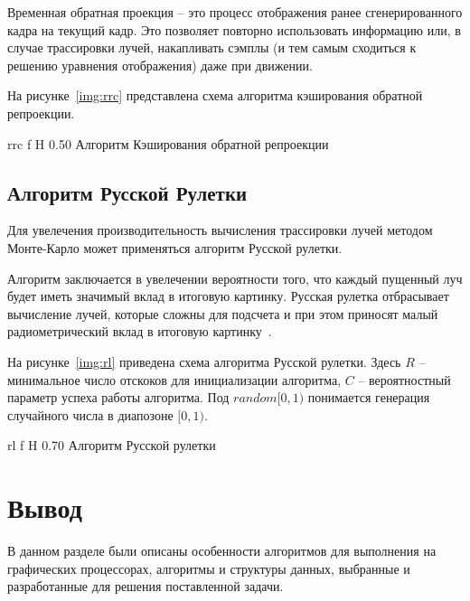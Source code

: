Временная обратная проекция -- это процесс отображения ранее сгенерированного кадра на 
текущий кадр. Это позволяет повторно использовать информацию или, в случае трассировки 
лучей, накапливать сэмплы (и тем самым сходиться к решению уравнения отображения) даже при движении.

На рисунке~\ref{img:rrc} представлена схема алгоритма кэширования обратной
репроекции.

    {rrc}
    {f}
    {H}
    {0.50\textwidth}
    {Алгоритм Кэширования обратной репроекции}

\subsection{Алгоритм Русской Рулетки}

Для увелечения производительность вычисления трассировки лучей методом 
Монте-Карло может применяться алгоритм Русской рулетки.

Алгоритм заключается в увелечении вероятности того, что каждый пущенный луч
будет иметь значимый вклад в итоговую картинку. Русская рулетка отбрасывает
вычисление лучей, которые сложны для подсчета и при этом приносят малый 
радиометрический вклад в итоговую картинку~\cite{PBRT3e}.

На рисунке~\ref{img:rl} приведена схема алгоритма Русской рулетки.
Здесь $R$ -- минимальное число отскоков для инициализации алгоритма, 
$C$ -- вероятностный параметр успеха работы алгоритма. Под $random[0,1)$ понимается
генерация случайного числа в диапозоне $[0,1)$.

    {rl}
    {f}
    {H}
    {0.70\textwidth}
    {Алгоритм Русской рулетки}

\section{Вывод}

В данном разделе были описаны особенности алгоритмов для выполнения
на графических процессорах, алгоритмы и структуры данных, выбранные 
и разработанные для решения поставленной задачи. 
